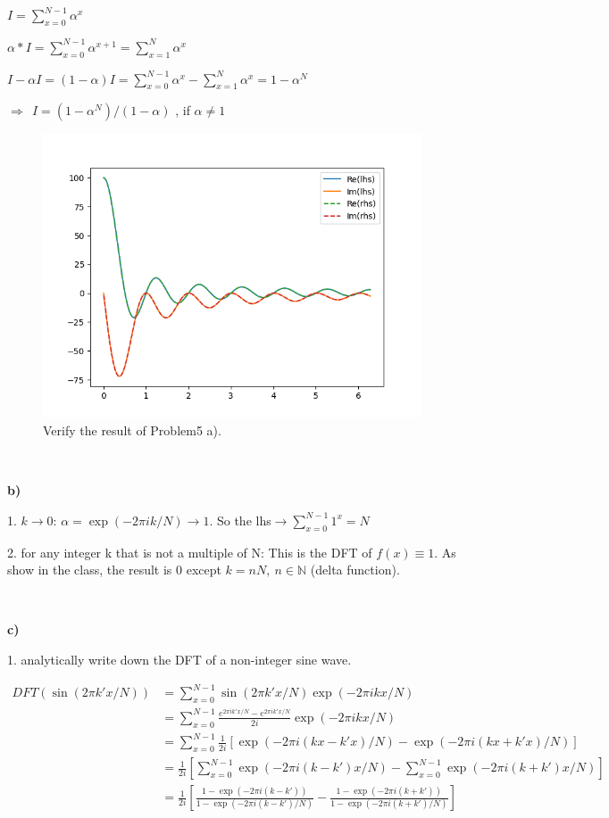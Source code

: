 \documentclass[showpacs, oneside, onecolumn, prl, amsmath, amssymb, nofootinbib, superscriptaddress, notitlepage]{revtex4-1}
\newcommand\bas{\begin{align*}}
\newcommand\bfig{\begin{figure}}
\newcommand\efig{\end{figure}}
\begin{document}
$I=\sum_{x=0}^{N-1}\alpha^x$

$\alpha*I=\sum_{x=0}^{N-1}\alpha^{x+1}=\sum_{x=1}^N \alpha^{x}$

$I-\alpha I=(1-\alpha)I=\sum_{x=0}^{N-1} \alpha^{x}-\sum_{x=1}^N \alpha^{x}=1-\alpha^N$

$\Rightarrow\ \ I=(1-\alpha^N)/(1-\alpha)$ ,  if $\alpha\neq1$

\bfig
	\centering
	\includegraphics[scale=0.85]{4-5-1.png}
	\caption{Verify the result of Problem5 a).}
	\label{4-5-1}
\efig


~~~~

\textbf{b)} 

1. $k\rightarrow 0$: $\alpha=\exp(-2\pi ik/N)\rightarrow 1$. So the lhs$\rightarrow\sum_{x=0}^{N-1}1^x=N$

2. for any integer k that is not a multiple of N: This is the DFT of $f(x)\equiv 1$. As show in the class, the result is 0 except $k=nN,\ n\in\mathbb N$ (delta function).

~~~~

\textbf{c)} 

1. analytically write down the DFT of a non-integer sine wave.

\bas
DFT(\sin(2\pi k'x/N))&=\sum_{x=0}^{N-1}\sin(2\pi k'x/N)\exp(-2\pi ikx/N)\\
&=\sum_{x=0}^{N-1}\frac{e^{2\pi ik'x/N}-e^{2\pi ik'x/N}}{2i}\exp(-2\pi ikx/N)\\
&=\sum_{x=0}^{N-1}\frac1{2i}[\exp(-2\pi i(kx-k'x)/N)-\exp(-2\pi i(kx+k'x)/N)]\\
&=\frac1{2i}\left[\sum_{x=0}^{N-1}\exp(-2\pi i(k-k')x/N)-\sum_{x=0}^{N-1}\exp(-2\pi i(k+k')x/N)\right]\\
&=\frac1{2i}\left[\frac{1-\exp(-2\pi i(k-k'))}{1-\exp(-2\pi i(k-k')/N)}-\frac{1-\exp(-2\pi i(k+k'))}{1-\exp(-2\pi i(k+k')/N)}\right]
\end{align*}
\end{document}
